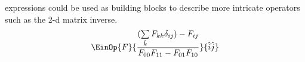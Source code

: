 \name{} expressions could be used as building blocks to describe more intricate operators such as the 2-d matrix inverse. 
\begin{displaymath} 
  \EinOp{F}{\frac{(\sum\limits_{\hat{k}}  F_{kk}\delta_{ij})-F_{ij} }{F_{00}F_{11} -F_{01}F_{10}}}{\hat{i}\hat{j}}\end{displaymath}
  
